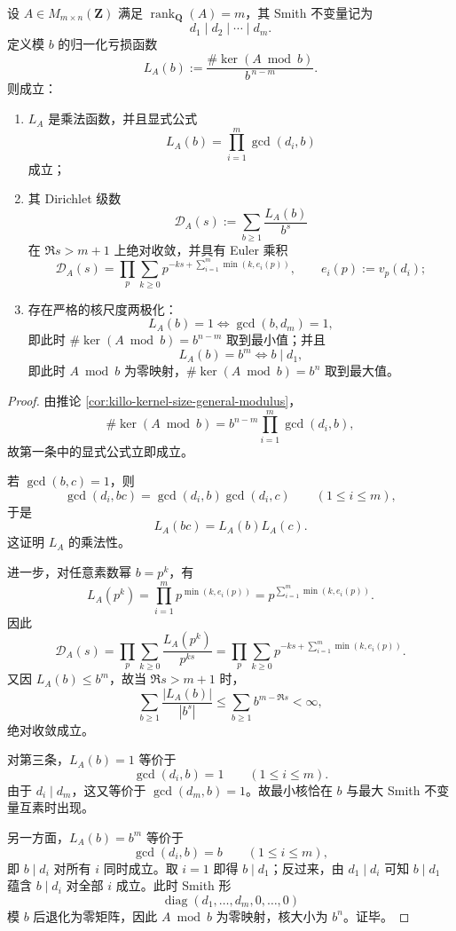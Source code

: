 \begin{theorem}\label{thm:conclusion-smith-loss-euler-multiplicativity-polarization}
设 \(A\in M_{m\times n}(\mathbf Z)\) 满足 \(\operatorname{rank}_{\mathbf Q}(A)=m\)，其 Smith 不变量记为
\[
d_1\mid d_2\mid \cdots \mid d_m.
\]
定义模 \(b\) 的归一化亏损函数
\[
L_A(b):=\frac{\#\ker(A\bmod b)}{b^{\,n-m}}.
\]
则成立：
\begin{enumerate}
  \item \(L_A\) 是乘法函数，并且显式公式
  \[
  L_A(b)=\prod_{i=1}^m \gcd(d_i,b)
  \]
  成立；
  \item 其 Dirichlet 级数
  \[
  \mathcal D_A(s):=\sum_{b\ge1}\frac{L_A(b)}{b^s}
  \]
  在 \(\Re s>m+1\) 上绝对收敛，并具有 Euler 乘积
  \[
  \mathcal D_A(s)
  =
  \prod_{p}
  \sum_{k\ge0}
  p^{-ks+\sum_{i=1}^m \min(k,e_i(p))},
  \qquad
  e_i(p):=v_p(d_i);
  \]
  \item 存在严格的核尺度两极化：
  \[
  L_A(b)=1
  \iff
  \gcd(b,d_m)=1,
  \]
  即此时 \(\#\ker(A\bmod b)=b^{n-m}\) 取到最小值；并且
  \[
  L_A(b)=b^m
  \iff
  b\mid d_1,
  \]
  即此时 \(A\bmod b\) 为零映射，\(\#\ker(A\bmod b)=b^n\) 取到最大值。
\end{enumerate}
\end{theorem}
\begin{proof}
由推论 \ref{cor:killo-kernel-size-general-modulus}，
\[
\#\ker(A\bmod b)=b^{n-m}\prod_{i=1}^m \gcd(d_i,b),
\]
故第一条中的显式公式立即成立。

若 \(\gcd(b,c)=1\)，则
\[
\gcd(d_i,bc)=\gcd(d_i,b)\gcd(d_i,c)
\qquad (1\le i\le m),
\]
于是
\[
L_A(bc)=L_A(b)L_A(c).
\]
这证明 \(L_A\) 的乘法性。

进一步，对任意素数幂 \(b=p^k\)，有
\[
L_A(p^k)
=
\prod_{i=1}^m p^{\min(k,e_i(p))}
=
p^{\sum_{i=1}^m \min(k,e_i(p))}.
\]
因此
\[
\mathcal D_A(s)
=
\prod_p \sum_{k\ge 0} \frac{L_A(p^k)}{p^{ks}}
=
\prod_p \sum_{k\ge 0}
p^{-ks+\sum_{i=1}^m\min(k,e_i(p))}.
\]
又因 \(L_A(b)\le b^m\)，故当 \(\Re s>m+1\) 时，
\[
\sum_{b\ge1}\frac{|L_A(b)|}{|b^s|}
\le
\sum_{b\ge1}b^{m-\Re s}
<
\infty,
\]
绝对收敛成立。

对第三条，\(L_A(b)=1\) 等价于
\[
\gcd(d_i,b)=1
\qquad (1\le i\le m).
\]
由于 \(d_i\mid d_m\)，这又等价于 \(\gcd(d_m,b)=1\)。故最小核恰在 \(b\) 与最大 Smith 不变量互素时出现。

另一方面，\(L_A(b)=b^m\) 等价于
\[
\gcd(d_i,b)=b
\qquad (1\le i\le m),
\]
即 \(b\mid d_i\) 对所有 \(i\) 同时成立。取 \(i=1\) 即得 \(b\mid d_1\)；反过来，由 \(d_1\mid d_i\) 可知 \(b\mid d_1\) 蕴含 \(b\mid d_i\) 对全部 \(i\) 成立。此时 Smith 形
\[
\operatorname{diag}(d_1,\dots,d_m,0,\dots,0)
\]
模 \(b\) 后退化为零矩阵，因此 \(A\bmod b\) 为零映射，核大小为 \(b^n\)。证毕。
\end{proof}

